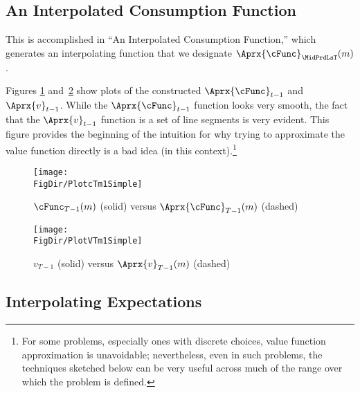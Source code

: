 \hypertarget{an-interpolated-consumption-function}{}
\subsection{An Interpolated Consumption Function} \label{subsec:LinInterp}


This is accomplished in ``An Interpolated Consumption Function,'' which generates an interpolating function that we designate $\Aprx{\cFunc}_{\MidPrdLsT}(m)$. %

Figures \ref{fig:PlotcTm1Simple} and~\ref{fig:PlotVTm1Simple} show
plots of the constructed $\Aprx{\cFunc}_{t-1}$ and $\Aprx{v}_{t-1}$. While the $\Aprx{\cFunc}_{t-1}$ function looks very smooth, the fact that the $\Aprx{v}_{t-1}$ function is a set of line segments is very evident.  This figure provides the beginning of the intuition for why trying to approximate the value function directly is a bad idea (in this context).\footnote{For some problems, especially ones with discrete choices, value function approximation is unavoidable; nevertheless, even in such problems, the techniques sketched below can be very useful across much of the range over which the problem is defined.}

\hypertarget{PlotcTm1Simple}{}
\begin{figure}
  \centerline{\texttt{[image: \\FigDir/PlotcTm1Simple]}}
  \caption{$\cFunc_{T-1}(m)$ (solid) versus $\Aprx{\cFunc}_{T-1}(m)$ (dashed)}
  \label{fig:PlotcTm1Simple}
\end{figure}

\hypertarget{PlotvTm1Simple}{}
\begin{figure}
  \centerline{\texttt{[image: \\FigDir/PlotVTm1Simple]}}
  \caption{$v_{T-1}$ (solid) versus $\Aprx{v}_{T-1}(m)$ (dashed)}
  \label{fig:PlotVTm1Simple}
\end{figure}


\hypertarget{interpolating-expectations}{}
\subsection{Interpolating Expectations}


